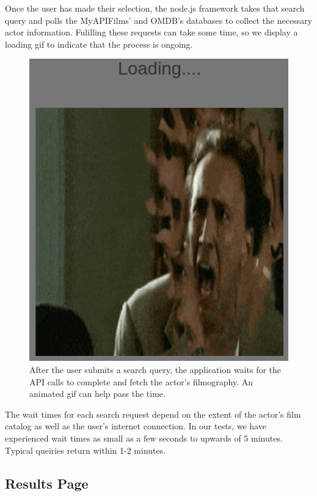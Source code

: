 \documentclass[12pt]{article}
\begin{document}
Once the user has made their selection, the node.js framework takes that search query and polls the MyAPIFilms' and OMDB's databases to collect the necessary actor information.  Fulilling these requests can take some time, so we display a loading gif to indicate that the process is ongoing.

			\begin{figure}[h!]
				\centering
				\includegraphics[scale=0.3]{images/loadingPage.png}
				\caption{After the user submits a search query, the application waits for the API calls to complete and fetch the actor's filmography. An animated gif can help pass the time.}
			\end{figure}

The wait times for each search request depend on the extent of the actor's film catalog as well as the user's internet connection.  In our tests, we have experienced wait times as small as a few seconds to upwards of 5 minutes. Typical queiries return within 1-2 minutes.


\subsection{Results Page}
\end{document}
